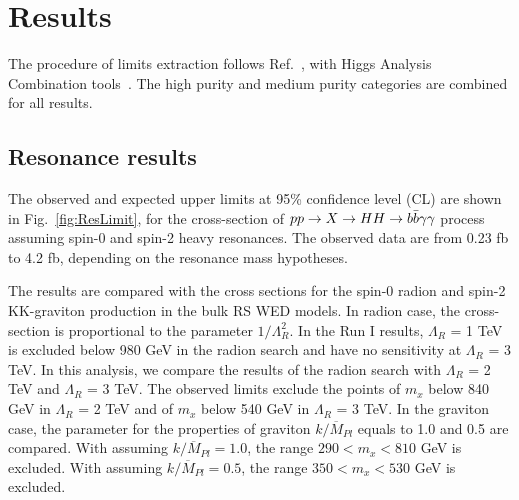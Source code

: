 \chapter{Results} %

\label{Chapter6} %



The procedure of limits extraction follows Ref.~\cite{1007.1727}, with Higgs Analysis Combination tools~\cite{CombinedTool}.
The high purity and medium purity categories are combined for all results.

\section{Resonance results}

The observed and expected upper limits at 95\% confidence level (CL) are shown in Fig.~\ref{fig:ResLimit}, for the cross-section of $pp \rightarrow X \rightarrow HH\to b\bar{b}\gamma\gamma$ process assuming spin-0 and spin-2 heavy resonances.
The observed data are from 0.23 fb to 4.2 fb, depending on the resonance mass hypotheses.

The results are compared with the cross sections for the spin-0 radion and spin-2 KK-graviton production in the bulk RS WED models.
In radion case, the cross-section is proportional to the parameter $1/ \Lambda^{2}_{R}$.
In the Run I results, $\Lambda_{R}$ = 1 TeV is excluded below 980 GeV in the radion search and have no sensitivity at $\Lambda_{R}$ = 3 TeV.
In this analysis, we compare the results of the radion search with  $\Lambda_{R}$ = 2 TeV and $\Lambda_{R}$ = 3 TeV.
The observed limits exclude the points of $m_{x}$ below 840 GeV in $\Lambda_{R}$ = 2 TeV and of $m_{x}$ below 540 GeV in $\Lambda_{R}$ = 3 TeV.
In the graviton case, the parameter for the properties of graviton $k/\overline{M}_{Pl}$ equals to 1.0 and 0.5 are compared.
With assuming $k/\overline{M}_{Pl} = 1.0$, the range $290<m_{x}<810$ GeV is excluded.
With assuming $k/\overline{M}_{Pl} = 0.5$, the range $350<m_{x}<530$ GeV is excluded.

